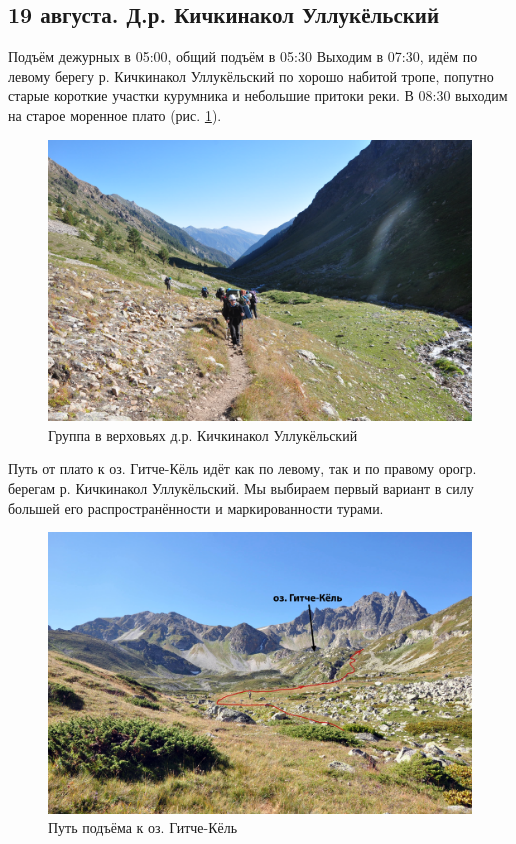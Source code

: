 \subsection{19 августа. Д.р. Кичкинакол Уллукёльский}

Подъём дежурных в 05:00, общий подъём в 05:30 
Выходим в 07:30, идём по левому берегу р. Кичкинакол Уллукёльский по хорошо набитой тропе, попутно  старые короткие участки курумника и небольшие притоки реки. В 08:30 выходим на старое моренное плато (рис. \ref{fig:DSC_0692}).

\begin{figure}[h]
	\centering
	\includegraphics[width=0.7\linewidth]{../pics/DSC_0692}
	\caption{Группа в верховьях д.р. Кичкинакол Уллукёльский}
	\label{fig:DSC_0692}
\end{figure}

Путь от плато к оз. Гитче-Кёль идёт как по левому, так и по правому орогр. берегам р. Кичкинакол Уллукёльский. Мы выбираем первый вариант в силу большей его распространённости и маркированности турами. 

\begin{figure}[h]
	\centering
	\includegraphics[width=0.7\linewidth]{../pics/DSC_0718}
	\caption{Путь подъёма к оз. Гитче-Кёль}
	\label{fig:DSC_0718}
\end{figure}

